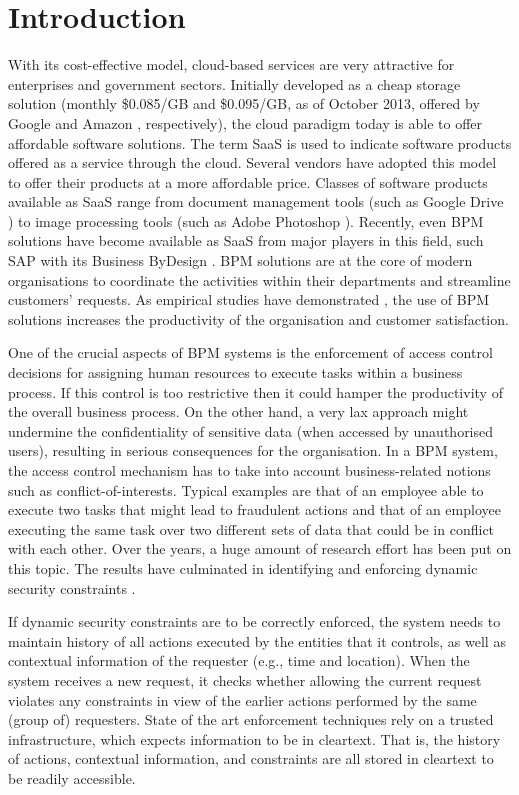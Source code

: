 \documentclass[epsfig,a4paper,11pt,titlepage]{book}
\numberwithin{algorithm}{chapter}
\begin{document}
\section{Introduction}
With its cost-effective model, cloud-based services are very attractive for enterprises and government sectors. Initially developed as a cheap storage solution (monthly \$0.085/GB and \$0.095/GB, as of October 2013, offered by Google \cite{Google:2013} and Amazon \cite{Amazon:2013}, respectively), the cloud paradigm today is able to offer affordable software solutions. The term \acrfull{SaaS} is used to indicate software products offered as a service through the cloud. Several vendors have adopted this model to offer their products at a more affordable price. Classes of software products available as \gls{SaaS} range from document management tools (such as Google Drive \cite{Google:2012}) to image processing tools (such as Adobe Photoshop \cite{Pehrson:2011}). Recently, even \gls{BPM} solutions have become available as \gls{SaaS} from major players in this field, such SAP with its Business ByDesign \cite{SAP:2013}. \gls{BPM} solutions are at the core of modern organisations to coordinate the activities within their departments and streamline customers' requests. As empirical studies have demonstrated \cite{Kohlbacher:2009}, the use of \gls{BPM} solutions increases the productivity of the organisation and customer satisfaction.

One of the crucial aspects of \gls{BPM} systems is the enforcement of access control decisions for assigning human resources to execute tasks within a business process. If this control is too restrictive then it could hamper the productivity of the overall business process. On the other hand, a very lax approach might undermine the confidentiality of sensitive data (when accessed by unauthorised users), resulting in serious consequences for the organisation. In a \gls{BPM} system, the access control mechanism has to take into account business-related notions such as conflict-of-interests. Typical examples are that of an employee able to execute two tasks that might lead to fraudulent actions and that of an employee executing the same task over two different sets of data that could be in conflict with each other. Over the years, a huge amount of research effort has been put on this topic. The results have culminated in identifying and enforcing dynamic security constraints \cite{Kong:2007, Sandhu:1996, Nash:1990, Brewer:1989}.

If dynamic security constraints are to be correctly enforced, the system needs to maintain history of all actions executed by the entities that it controls, as well as contextual information of the requester (e.g., time and location). When the system receives a new request, it checks whether allowing the current request violates any constraints in view of the earlier actions performed by the same (group of) requesters. State of the art enforcement techniques \cite{Crampton:2009, Joshi:2005, Ahn:2000, Gligor:1998} rely on a trusted infrastructure, which expects information to be in cleartext. That is, the history of actions, contextual information, and constraints are all stored in cleartext to be readily accessible. 
\end{document}
